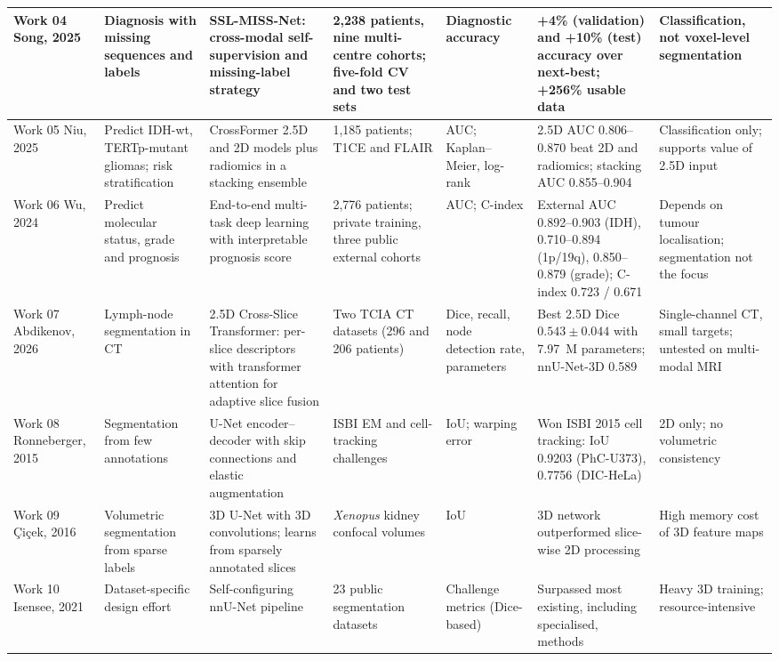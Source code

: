 \begin{landscape}
\begin{longtable}{|p{2.2cm}|p{2.6cm}|p{3.6cm}|p{2.7cm}|p{2.6cm}|p{3.2cm}|p{3.2cm}|}
Work 04 \cite{song2025} Song, 2025 & Diagnosis with missing sequences and labels & SSL-MISS-Net: cross-modal self-supervision and missing-label strategy & 2,238 patients, nine multi-centre cohorts; five-fold CV and two test sets & Diagnostic accuracy & +4\% (validation) and +10\% (test) accuracy over next-best; +256\% usable data & Classification, not voxel-level segmentation\\\hline
Work 05 \cite{niu2025} Niu, 2025 & Predict IDH-wt, TERTp-mutant gliomas; risk stratification & CrossFormer 2.5D and 2D models plus radiomics in a stacking ensemble & 1,185 patients; T1CE and FLAIR & AUC; Kaplan--Meier, log-rank & 2.5D AUC 0.806--0.870 beat 2D and radiomics; stacking AUC 0.855--0.904 & Classification only; supports value of 2.5D input\\\hline
Work 06 \cite{wu2024} Wu, 2024 & Predict molecular status, grade and prognosis & End-to-end multi-task deep learning with interpretable prognosis score & 2,776 patients; private training, three public external cohorts & AUC; C-index & External AUC 0.892--0.903 (IDH), 0.710--0.894 (1p/19q), 0.850--0.879 (grade); C-index 0.723 / 0.671 & Depends on tumour localisation; segmentation not the focus\\\hline
Work 07 \cite{abdikenov2026} Abdikenov, 2026 & Lymph-node segmentation in CT & 2.5D Cross-Slice Transformer: per-slice descriptors with transformer attention for adaptive slice fusion & Two TCIA CT datasets (296 and 206 patients) & Dice, recall, node detection rate, parameters & Best 2.5D Dice $0.543 \pm 0.044$ with 7.97~M parameters; nnU-Net-3D 0.589 & Single-channel CT, small targets; untested on multi-modal MRI\\\hline
Work 08 \cite{ronneberger2015} Ronneberger, 2015 & Segmentation from few annotations & U-Net encoder--decoder with skip connections and elastic augmentation & ISBI EM and cell-tracking challenges & IoU; warping error & Won ISBI 2015 cell tracking: IoU 0.9203 (PhC-U373), 0.7756 (DIC-HeLa) & 2D only; no volumetric consistency\\\hline
Work 09 \cite{cicek2016} \c{C}i\c{c}ek, 2016 & Volumetric segmentation from sparse labels & 3D U-Net with 3D convolutions; learns from sparsely annotated slices & \emph{Xenopus} kidney confocal volumes & IoU & 3D network outperformed slice-wise 2D processing & High memory cost of 3D feature maps\\\hline
Work 10 \cite{isensee2021} Isensee, 2021 & Dataset-specific design effort & Self-configuring nnU-Net pipeline & 23 public segmentation datasets & Challenge metrics (Dice-based) & Surpassed most existing, including specialised, methods & Heavy 3D training; resource-intensive\\\hline

\end{longtable}
\end{landscape}
